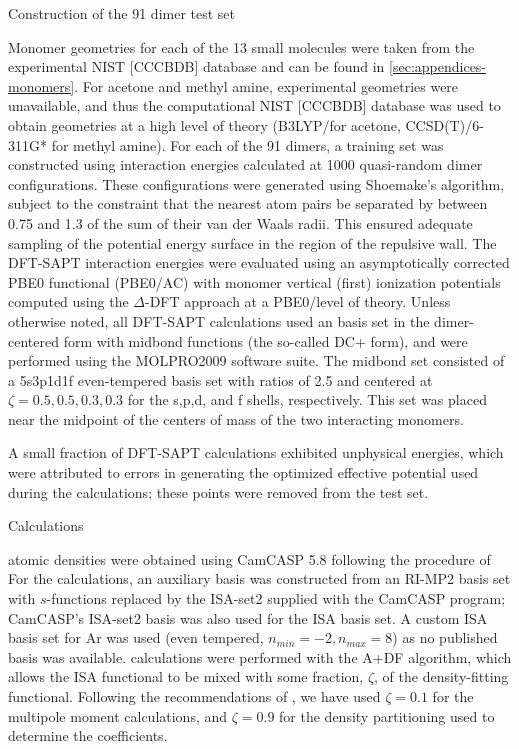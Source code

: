 \begin{subsection}{Construction of the 91 dimer test set}

Monomer geometries for each of the 13 small molecules were taken from the
experimental NIST
\mbox[CCCBDB] database\cite{Johnson2015NIST} and can be found in
\cref{sec:appendices-monomers}.
For acetone and methyl amine, experimental geometries were
unavailable, and thus
the computational NIST \mbox[CCCBDB] database was used to obtain geometries at
a high level of theory (B3LYP/\avtz for acetone, CCSD(T)/6-311G* for methyl
amine).
For each of the 91 dimers, a training set was constructed
using \saptpbeo interaction energies calculated at 1000 quasi-random dimer
configurations. These configurations were generated using Shoemake's
algorithm,\cite{Shoemake1992} subject to the constraint that the nearest atom pairs
be separated by between 0.75 and 1.3 of the sum of their van der Waals radii. 
This ensured adequate sampling of the potential 
energy surface in the region of the repulsive wall.
The DFT-SAPT interaction energies were evaluated using an asymptotically corrected
PBE0 functional (PBE0/AC) with monomer vertical (first) ionization potentials
computed using the $\Delta$-DFT approach at a PBE0/\avtz level of theory.
Unless otherwise noted, all DFT-SAPT calculations used an \avtz basis set in the 
dimer-centered form with midbond functions (the so-called DC+ form),
and were performed using the MOLPRO2009 software suite.\cite{MOLPRO-WIREs}
The midbond set consisted of a 5s3p1d1f even-tempered basis set with ratios
of 2.5 and centered at $\zeta = 0.5, 0.5, 0.3, 0.3$ for the s,p,d, and f shells,
respectively. This set was placed near the midpoint of the centers of mass of
the two interacting monomers.

A small fraction of DFT-SAPT calculations exhibited unphysical
energies, which were attributed to errors in generating the optimized
effective potential used during the \saptpbeo calculations; these points were
removed from the test set.

\end{subsection}
\begin{subsection}{\bsisa Calculations}


\bsisa atomic densities were obtained using CamCASP 5.8
\cite{camcasp5.8, WCMS:WCMS1172, orient4.8}
following the procedure of \citeauthor{Misquitta2014}\cite{Misquitta2014}
For the \bsisa calculations, an auxiliary basis was constructed from an RI-MP2
\avtz basis set with $s$-functions replaced by the ISA-set2
supplied with the CamCASP program;
CamCASP's ISA-set2 basis was also used for the ISA basis
set.\cite{Misquitta2014} A custom ISA basis set for Ar was used 
(even tempered, $n_{min} = -2, n_{max} = 8$)
\cite{Misquitta2014} 
as no published basis was available.
\bsisa calculations were performed with the A+DF algorithm, which allows the 
ISA functional to be mixed with some fraction, $\zeta$, of the density-fitting functional.
Following the recommendations of \citeauthor{Misquitta2014}\cite{Misquitta2014},
we have used $\zeta=0.1$ for the multipole moment calculations, 
and $\zeta=0.9$ for the density partitioning used to determine the \B coefficients. 


\end{subsection}
